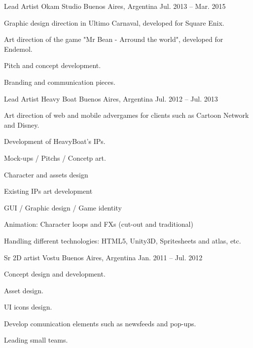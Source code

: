 \begin{cventries}
  \cventry
    {Lead Artist} %
    {Okam Studio} %
    {Buenos Aires, Argentina} %
    {Jul. 2013 – Mar. 2015} %
    {
      \begin{cvitems} %
        \item {Graphic design direction in Ultimo Carnaval, developed for Square Enix.}
        \item {Art direction of the game "Mr Bean - Arround the world", developed for Endemol.}
        \item {Pitch and concept development.}
        \item {Branding and communication pieces.}
      \end{cvitems}
    }

  \cventry
    {Lead Artist} %
    {Heavy Boat} %
    {Buenos Aires, Argentina} %
    {Jul. 2012 – Jul. 2013} %
    {
      \begin{cvitems} %
       \item {Art direction of web and mobile advergames for clients such as Cartoon Network and Disney.}
       \item {Development of HeavyBoat's IPs.}
       \item {Mock-ups / Pitchs / Concetp art.}
       \item {Character and assets design}
       \item {Existing IPs art development}
       \item {GUI / Graphic design / Game identity}
       \item {Animation: Character loops and FXs (cut-out and traditional)}
       \item {Handling different technologies: HTML5, Unity3D, Spritesheets and atlas, etc.}
      \end{cvitems}
    }
  \cventry
    {Sr 2D artist} %
    {Vostu} %
    {Buenos Aires, Argentina} %
    {Jan. 2011 – Jul. 2012 } %
    {
      \begin{cvitems} %
        \item {Concept design and development.}
        \item {Asset design.}
        \item {UI icons design.}
        \item {Develop comunication elements such as newsfeeds and pop-ups.}
        \item {Leading small teams.}
      \end{cvitems}
    }


\end{cventries}

